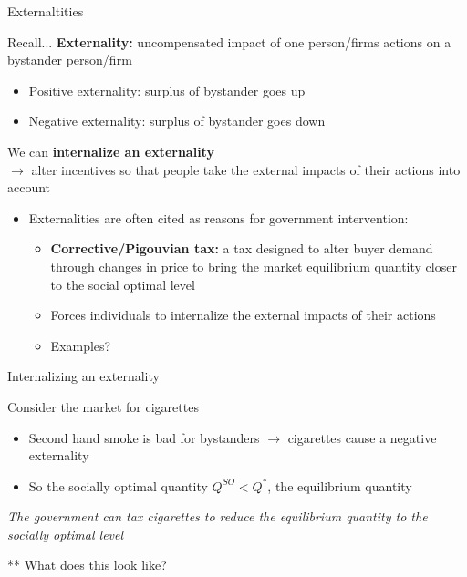\documentclass[compress]{beamer}
\begin{document}
\begin{frame}{Externaltities}
   
   Recall... \textbf{Externality:} uncompensated impact of one person/firms actions on a bystander person/firm
\begin{itemize}
    \item Positive externality: surplus of bystander goes up
    \item Negative externality: surplus of bystander goes down
\end{itemize}
\vspace{2mm}
We can \textbf{internalize an externality}\\
\quad $\to$ alter incentives so that people take the external impacts of their actions into account

\begin{itemize}
    \item Externalities are often cited as reasons for government intervention:
    \begin{itemize}
        \item \textbf{Corrective/Pigouvian tax:} a tax designed to alter buyer demand through changes in price to bring the market equilibrium quantity closer to the social optimal level
        \item Forces individuals to internalize the external impacts of their actions
        \item Examples?
    \end{itemize}
\end{itemize}
\end{frame}

\begin{frame}{Internalizing an externality}
\begin{block}{Consider the market for cigarettes}
    \begin{itemize}
        \item Second hand smoke is bad for bystanders $\to$ cigarettes cause a negative externality
        \item So the socially optimal quantity $Q^{SO} < Q^*$, the equilibrium quantity 
    \end{itemize}
    \begin{center}
        \textit{The government can tax cigarettes to reduce the equilibrium quantity to the socially optimal level}
    \end{center}
\end{block}
\vspace{3mm}
** What does this look like?
\end{frame}
\end{document}
